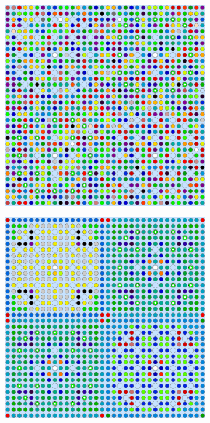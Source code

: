 \documentclass[12pt,twoside]{mitthesis-exec}
\begin{document}
\begin{figure}[h!]
\begin{subfigure}{0.47\textwidth}
  \includegraphics[width=0.95\linewidth]{figures/quantification/homogenization/2x2-degenerate-materials}
  \caption{}
  \label{fig:reflector-degenerate}
\end{subfigure}
\begin{subfigure}{0.47\textwidth}
  \centering
  \includegraphics[width=0.95\linewidth]{figures/patterns/lns/reflector/materials}

\end{subfigure}
\end{figure}
\end{document}
